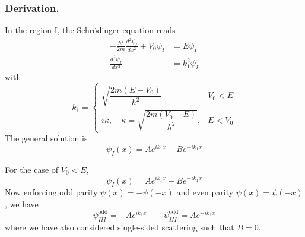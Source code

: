 \documentclass[../../../main.tex]{subfiles}
\begin{document}
\subsubsection{Derivation.}
In the region I, the Schrödinger equation reads
\begin{align*}
    -\frac{\hbar^2}{2 m} \frac{d^2 \psi_{I}}{dx^2} + V_0 \psi_{I} & =  E \psi_{I}   \\
    \frac{d^2 \psi_{I}}{dx^2}                                     & = k_1^2\psi_{I}
\end{align*}
with
\begin{equation*}
    k_1 =
    \begin{cases}
        \sqrt{\dfrac{2 m (E - V_0)}{\hbar^2}}                           & V_0<E   \\
        i \kappa, \quad \kappa = \sqrt{\dfrac{2 m (V_0 - E)}{\hbar^2}}, & E < V_0
    \end{cases}
\end{equation*}
The general solution is
\begin{equation*}
    \psi_{I}(x) = A e^{ik_1x} + B e^{-ik_1 x}
\end{equation*}

For the case of $V_0<E$,
\begin{equation*}
    \psi_{I}(x) = A e^{i k_1 x} + B e^{-i k_1 x}
\end{equation*}
Now enforcing odd parity $\psi(x)=-\psi(-x)$ and even  parity $\psi(x)=\psi(-x)$, we have
\begin{equation*}
    \psi_{III}^{\text{odd}}=-A e^{i k_1 x}
    \qquad
    \psi_{III}^{\text{odd}}=A e^{-i k_1 x}
\end{equation*}
where we have also considered single-sided scattering such that $B=0$.
\end{document}
